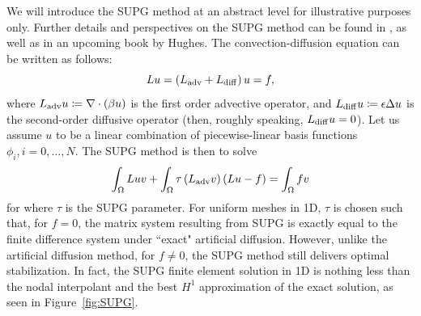 \documentclass{report}
\newcommand{\grad}{\nabla}
\renewcommand{\div}{\grad \cdot}
\begin{document}
We will introduce the SUPG method at an abstract level for illustrative purposes only.  Further details and perspectives on the SUPG method can be found in \cite{SUPG}, as well as in an upcoming book by Hughes.  The convection-diffusion equation can be written as follows:
\[
Lu = \left(L_{\rm adv} + L_{\rm diff} \right) u = f,
\]
where $L_{\rm adv}u \coloneqq \div \left(\beta u\right)$ is the first order advective operator, and $L_{\rm diff}u \coloneqq \epsilon \Delta u$ is the second-order diffusive operator (then, roughly speaking, $L_{\rm diff} u = 0$).  Let us assume $u$ to be a linear combination of piecewise-linear basis functions $\phi_i, i = 0,\ldots,N$.  The SUPG method is then to solve
\[
\int_\Omega L u v + \int_\Omega \tau \left(L_{\rm adv}v\right)\left( L u - f\right) = \int_\Omega f v 
\]
for where $\tau$ is the SUPG parameter.  For uniform meshes in 1D, $\tau$ is chosen such that, for $f=0$, the matrix system resulting from SUPG is exactly equal to the finite difference system under ``exact" artificial diffusion.  However, unlike the artificial diffusion method, for $f\neq 0$, the SUPG method still delivers optimal stabilization.  In fact, the SUPG finite element solution in 1D is nothing less than the nodal interpolant and the best $H^1$ approximation of the exact solution, as seen in Figure~\ref{fig:SUPG}.
\end{document}
